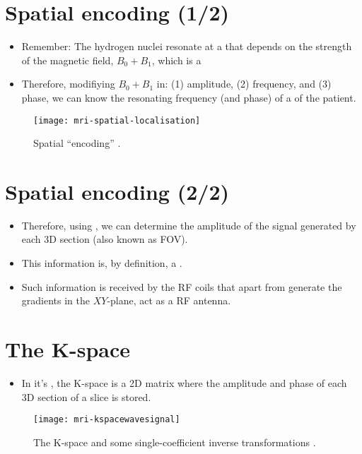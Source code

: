\section{Spatial encoding (1/2)}
\label{sec:spatial_encoding}
\begin{itemize}
\item Remember: The hydrogen nuclei resonate at a
   that depends on the strength of
  the magnetic field, $B_0+B_1$, which is a 
\item Therefore, modifiying $B_0+B_1$ in: (1) amplitude, (2)
  frequency, and (3) phase, we can know the resonating frequency (and
  phase) of a  of the patient.
\end{itemize}
\vspace{-4ex}
\begin{figure}[!b]
  \centering
  \texttt{[image: mri-spatial-localisation]}
  \caption{Spatial ``encoding'' \cite{abdulla2025MRI_encoding}.}
  \label{fig:MRI-encoding}
\end{figure}

\section*{Spatial encoding (2/2)}
\begin{itemize}
\item Therefore, using , we can determine the amplitude of the
  signal generated by each 3D section (also known as \gls{FOV}).
\item This information is, by definition, a .
\item Such information is received by the RF coils that apart from
  generate the gradients in the $XY$-plane, act as a RF antenna.
\end{itemize}

\section{The K-space}
\begin{itemize}
\item In it's , the K-space is a 2D matrix where the
  amplitude and phase of each 3D section of a slice is stored.
\end{itemize}
\vspace{-4ex}
\begin{figure}[!b]
  \centering
  \texttt{[image: mri-kspacewavesignal]}
  \caption{The K-space and some single-coefficient inverse transformations \cite{abdulla2025MRI_Kspace}.}
  \label{fig:MRI-Kspace}
\end{figure}

